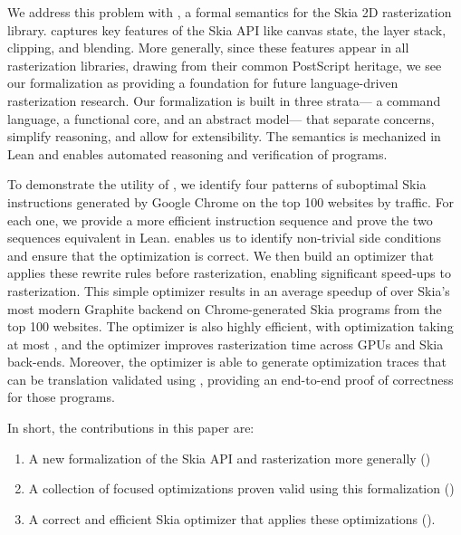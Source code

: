 \documentclass[main.tex]{subfiles}
\begin{document}
We address this problem with \muskia,
  a formal semantics for the Skia 2D rasterization library.
\muskia captures key features of the Skia API
  like canvas state, the layer stack, clipping, and blending.
More generally,
  since these features appear in all rasterization libraries,
  drawing from their common PostScript heritage,
  we see our formalization as providing a foundation
  for future language-driven rasterization research.
Our formalization is built in three strata---%
  a command language, a functional core, and an abstract model---%
  that separate concerns, simplify reasoning, and allow for extensibility.
The semantics is mechanized in Lean
  and enables automated reasoning and verification of \muskia programs.

To demonstrate the utility of \muskia,
  we identify four patterns of suboptimal Skia instructions
  generated by Google Chrome on the top 100 websites by traffic.
For each one, we provide a more efficient instruction sequence
  and prove the two sequences equivalent in Lean.
\muskia enables us to identify non-trivial side conditions
  and ensure that the optimization is correct.
We then build an optimizer that
  applies these rewrite rules before rasterization,
  enabling significant speed-ups to rasterization.
This simple optimizer results in an average speedup
  of \graphiteAppleGeoSpeedup over Skia's most modern Graphite backend
  on \graphiteAppleNumBench Chrome-generated Skia programs
  from the top 100 websites.
The optimizer is also highly efficient,
  with optimization taking at most \graphiteAppleMaxOptTime,
  and the optimizer improves rasterization time across GPUs and Skia back-ends.
Moreover, the optimizer is able to generate optimization traces
  that can be translation validated using \muskia,
  providing an end-to-end proof of correctness for those programs.

In short, the contributions in this paper are:
\begin{enumerate}
\item A new formalization of the Skia API and rasterization more generally ()
\item A collection of focused optimizations proven valid using this formalization ()
\item A correct and efficient Skia optimizer that applies these optimizations ().
\end{enumerate}
\end{document}
